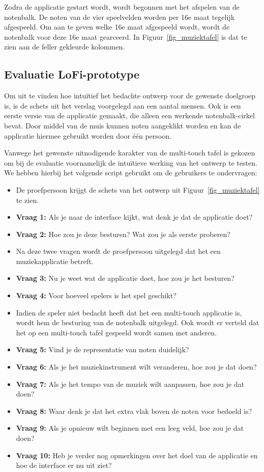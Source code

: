 \documentclass{acm}
\begin{document}
Zodra de applicatie gestart wordt, wordt begonnen met het afspelen van de notenbalk. De noten van de vier speelvelden worden per 16e maat tegelijk afgespeeld. Om aan te geven welke 16e maat afgespeeld wordt, wordt de notenbalk voor deze 16e maat gearceerd. In Figuur~\ref{fig_muziektafel} is dat te zien aan de feller gekleurde kolommen.

\subsection{Evaluatie LoFi-prototype}
Om uit te vinden hoe intuïtief het bedachte ontwerp voor de gewenste doelgroep is, is de schets uit het verslag voorgelegd aan een aantal mensen. Ook is een eerste versie van de applicatie gemaakt, die alleen een werkende notenbalk-cirkel bevat. Door middel van de muis kunnen noten aangeklikt worden en kan de applicatie hiermee gebruikt worden door één persoon.

Vanwege het gewenste uitnodigende karakter van de multi-touch tafel is gekozen om bij de evaluatie voornamelijk de intuïtieve werking van het ontwerp te testen. We hebben hierbij het volgende script gebruikt om de gebruikers te ondervragen:

\begin{itemize}
  \item De proefpersoon krijgt de schets van het ontwerp uit Figuur~\ref{fig_muziektafel} te zien.
  \item \textbf{Vraag 1:} Als je naar de interface kijkt, wat denk je dat de applicatie doet?
  \item \textbf{Vraag 2:} Hoe zou je deze besturen? Wat zou je als eerste proberen?
  \item Na deze twee vragen wordt de proefpersoon uitgelegd dat het een muziekapplicatie betreft.
  \item \textbf{Vraag 3:} Nu je weet wat de applicatie doet, hoe zou je het besturen?
  \item \textbf{Vraag 4:} Voor hoeveel spelers is het spel geschikt?
  \item Indien de speler niet bedacht heeft dat het een multi-touch applicatie is, wordt hem de besturing van de notenbalk uitgelegd. Ook wordt er verteld dat het op een multi-touch tafel gespeeld wordt samen met anderen.
  \item \textbf{Vraag 5:} Vind je de representatie van noten duidelijk?
  \item \textbf{Vraag 6:} Als je het muziekinstrument wilt veranderen, hoe zou je dat doen?
  \item \textbf{Vraag 7:} Als je het tempo van de muziek wilt aanpassen, hoe zou je dat doen?
  \item \textbf{Vraag 8:} Waar denk je dat het extra vlak boven de noten voor bedoeld is?
  \item \textbf{Vraag 9:} Als je opnieuw wilt beginnen met een leeg veld, hoe zou je dat doen?
  \item \textbf{Vraag 10:} Heb je verder nog opmerkingen over het doel van de applicatie en hoe de interface er nu uit ziet?
\end{itemize}
\end{document}
